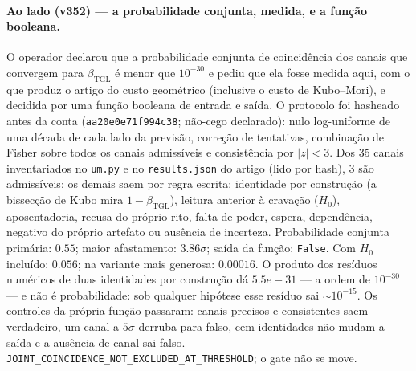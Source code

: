 \documentclass[11pt]{article}
\newcommand{\bTGL}{\beta_{\mathrm{TGL}}}\newcommand{\Msun}{M_{\odot}}\newcommand{\TGL}{\mathrm{TGL}}
\theoremstyle{definition}\newtheorem{deriv}{Derivação}
\begin{document}
\paragraph*{Ao lado (v352) --- a probabilidade conjunta, medida, e a função booleana.} O operador declarou que a probabilidade conjunta de coincidência dos canais que convergem para $\bTGL$ é menor que $10^{-30}$ e pediu que ela fosse medida aqui, com o que produz o artigo do custo geométrico (inclusive o custo de Kubo--Mori), e decidida por uma função booleana de entrada e saída. O protocolo foi hasheado antes da conta (\texttt{aa20e0e71f994c38}; não-cego declarado): nulo log-uniforme de uma década de cada lado da previsão, correção de tentativas, combinação de Fisher sobre todos os canais admissíveis e consistência por $|z|<3$. Dos 35 canais inventariados no \texttt{um.py} e no \texttt{results.json} do artigo (lido por hash), 3 são admissíveis; os demais saem por regra escrita: identidade por construção (a bissecção de Kubo mira $1-\bTGL$), leitura anterior à cravação ($H_0$), aposentadoria, recusa do próprio rito, falta de poder, espera, dependência, negativo do próprio artefato ou ausência de incerteza. Probabilidade conjunta primária: $0.55$; maior afastamento: $3.86\sigma$; saída da função: \texttt{False}. Com $H_0$ incluído: $0.056$; na variante mais generosa: $0.00016$. O produto dos resíduos numéricos de duas identidades por construção dá $5.5e-31$ --- a ordem de $10^{-30}$ --- e não é probabilidade: sob qualquer hipótese esse resíduo sai $\sim10^{-15}$. Os controles da própria função passaram: canais precisos e consistentes saem verdadeiro, um canal a $5\sigma$ derruba para falso, cem identidades não mudam a saída e a ausência de canal sai falso. \texttt{JOINT\_COINCIDENCE\_NOT\_EXCLUDED\_AT\_THRESHOLD}; o gate não se move.
\end{document}
